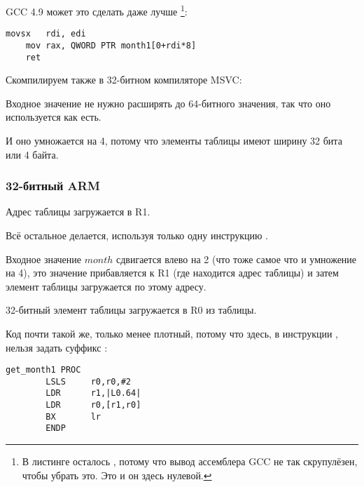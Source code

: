 \Optimizing GCC 4.9 может это сделать даже лучше
\footnote{В листинге осталось , потому что вывод ассемблера GCC не так скрупулёзен, чтобы убрать это.
Это  и он здесь нулевой.}:

\begin{lstlisting}[caption=\Optimizing GCC 4.9 x64,style=customasmx86]
	movsx	rdi, edi
	mov	rax, QWORD PTR month1[0+rdi*8]
	ret
\end{lstlisting}


Скомпилируем также в 32-битном компиляторе MSVC:



Входное значение не нужно расширять до 64-битного значения, так что оно используется как есть.

И оно умножается на 4, потому что элементы таблицы имеют ширину 32 бита или 4 байта.

\subsubsection{32-битный ARM}




Адрес таблицы загружается в R1.

Всё остальное делается, используя только одну инструкцию \LDR.

Входное значение $month$ сдвигается влево на 2 (что тоже самое что и умножение на 4), это значение
прибавляется к R1 (где находится адрес таблицы) и затем элемент таблицы загружается по этому адресу.

32-битный элемент таблицы загружается в R0 из таблицы.


Код почти такой же, только менее плотный, потому что здесь, в инструкции \LDR, нельзя задать суффикс \LSL:

\begin{lstlisting}[style=customasmARM]
get_month1 PROC
        LSLS     r0,r0,#2
        LDR      r1,|L0.64|
        LDR      r0,[r1,r0]
        BX       lr
        ENDP
\end{lstlisting}

